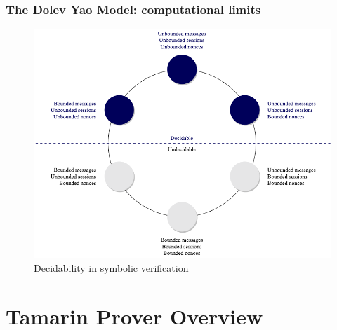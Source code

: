 \documentclass[aspectratio=169,t,xcolor=table]{beamer}
\begin{document}
\begin{frame}
    \frametitle{The Dolev Yao Model: computational limits}

    \begin{figure}
        \centering
        \includegraphics[width=.6\textwidth]{images/decidabilitydiagram.png}
        \caption{Decidability in symbolic verification}
    \end{figure}
\end{frame}

\section{Tamarin Prover Overview}
\end{document}

